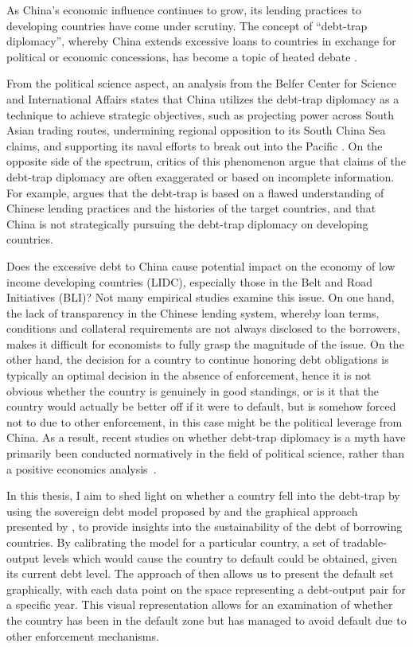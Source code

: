 As China's economic influence continues to grow, its lending practices to developing countries have come under scrutiny.
The concept of ``debt-trap diplomacy'', whereby China extends excessive loans to countries in exchange for political or economic concessions, has become a topic of heated debate \citep{Chellaney_2017}.

From the political science aspect, an analysis from the Belfer Center for Science and International Affairs states that China utilizes the debt-trap diplomacy as a technique to achieve strategic objectives, such as projecting power across South Asian trading routes, undermining regional opposition to its South China Sea claims, and supporting its naval efforts to break out into the Pacific \citep*{Parker2018}.
On the opposite side of the spectrum, critics of this phenomenon argue that claims of the debt-trap diplomacy are often exaggerated or based on incomplete information. For example, \citet*{Brautigam-meme-2020} argues that the debt-trap is based on a flawed understanding of Chinese lending practices and the histories of the target countries, and that China is not strategically pursuing the debt-trap diplomacy on developing countries.

Does the excessive debt to China cause potential impact on the economy of low income developing countries (LIDC), especially those in the Belt and Road Initiatives (BLI)? Not many empirical studies examine this issue.
On one hand, the lack of transparency in the Chinese lending system, whereby loan terms, conditions and collateral requirements are not always disclosed to the borrowers, makes it difficult for economists to fully grasp the magnitude of the issue.
On the other hand, the decision for a country to continue honoring debt obligations is typically an optimal decision in the absence of enforcement, hence it is not obvious whether the country is genuinely in good standings, or is it that the country would actually be better off if it were to default, but is somehow forced not to due to other enforcement, in this case might be the political leverage from China.
As a result, recent studies on whether debt-trap diplomacy is a myth have primarily been conducted normatively in the field of political science, rather than a positive economics analysis~\citep[See, e.g.,][]{Himmer2023-vn,Chen2020-eo}.

In this thesis, I aim to shed light on whether a country fell into the debt-trap by using the sovereign debt model proposed by \citet{Na-18} and the graphical approach presented by \citet{Hinrichsen_2020-chapter4}, to provide insights into the sustainability of the debt of borrowing countries.
By calibrating the model for a particular country, a set of tradable-output levels which would cause the country to default could be obtained, given its current debt level. The approach of \citet{Hinrichsen_2020-chapter4} then allows us to present the default set graphically, with each data point on the space representing a debt-output pair for a specific year. This visual representation allows for an examination of whether the country has been in the default zone but has managed to avoid default due to other enforcement mechanisms.

